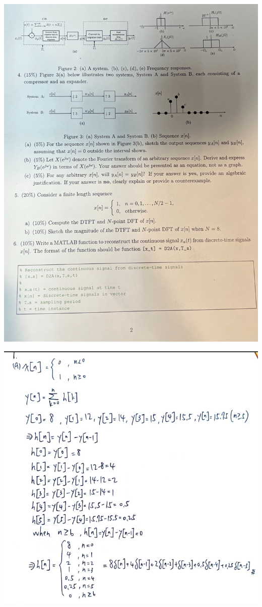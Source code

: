 \documentclass[a4paper]{article}
\begin{document}
	\begin{center}
		\includegraphics[width=1.2\linewidth]{page2.jpeg}
	\end{center}
	
	\begin{center}
		\includegraphics[width=1\linewidth]{screenshot123}
	\end{center}
	
\end{document}
